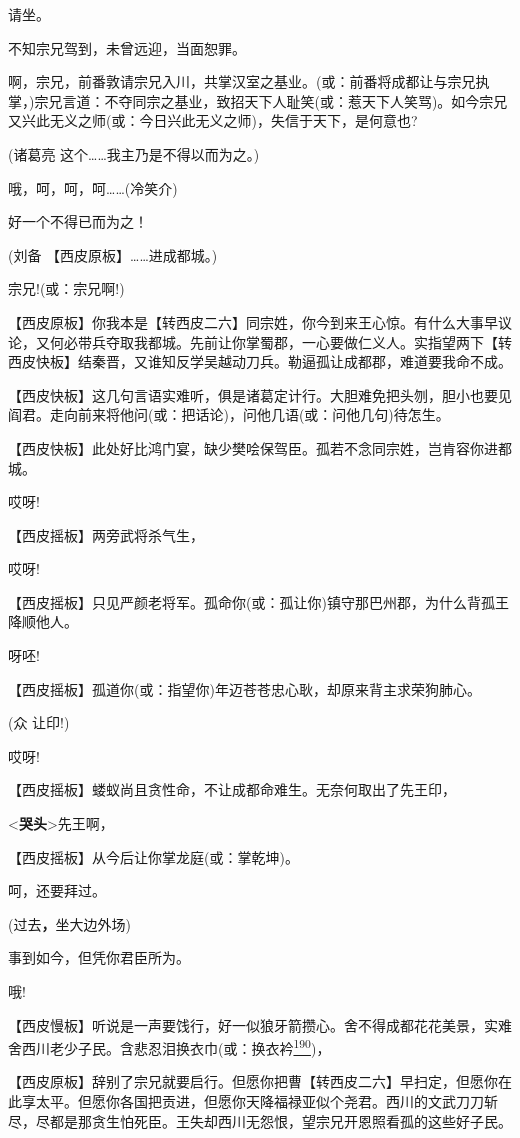 请坐。

不知宗兄驾到，未曾远迎，当面恕罪。

啊，宗兄，前番敦请宗兄入川，共掌汉室之基业。(或：前番将成都让与宗兄执掌，)宗兄言道：不夺同宗之基业，致招天下人耻笑(或：惹天下人笑骂)。如今宗兄又兴此无义之师(或：今日兴此无义之师)，失信于天下，是何意也?

(诸葛亮 这个\ldots{}\ldots{}我主乃是不得以而为之。)

哦，呵，呵，呵\ldots{}\ldots{}(冷笑介)

好一个不得已而为之！

(刘备 【西皮原板】\ldots{}\ldots{}进成都城。)

宗兄!(或：宗兄啊!)

【西皮原板】你我本是【转西皮二六】同宗姓，你今到来王心惊。有什么大事早议论，又何必带兵夺取我都城。先前让你掌蜀郡，一心要做仁义人。实指望两下【转西皮快板】结秦晋，又谁知反学吴越动刀兵。勒逼孤让成都郡，难道要我命不成。

【西皮快板】这几句言语实难听，俱是诸葛定计行。大胆难免把头刎，胆小也要见阎君。走向前来将他问(或：把话论)，问他几语(或：问他几句)待怎生。

【西皮快板】此处好比鸿门宴，缺少樊哙保驾臣。孤若不念同宗姓，岂肯容你进都城。

哎呀!

【西皮摇板】两旁武将杀气生，

哎呀!

【西皮摇板】只见严颜老将军。孤命你(或：孤让你)镇守那巴州郡，为什么背孤王降顺他人。

呀呸!

【西皮摇板】孤道你(或：指望你)年迈苍苍忠心耿，却原来背主求荣狗肺心。

(众 让印!)

哎呀!

【西皮摇板】蝼蚁尚且贪性命，不让成都命难生。无奈何取出了先王印，

\textless{}\textbf{哭头}\textgreater{}先王啊，

【西皮摇板】从今后让你掌龙庭(或：掌乾坤)。

呵，还要拜过。

(过去\textbf{，}坐大边外场)

事到如今，但凭你君臣所为。

哦!

【西皮慢板】听说是一声要饯行，好一似狼牙箭攒心。舍不得成都花花美景，实难舍西川老少子民。含悲忍泪换衣巾(或：换衣衿\protect\hyperlink{fn190}{\textsuperscript{190}})，

【西皮原板】辞别了宗兄就要启行。但愿你把曹【转西皮二六】早扫定，但愿你在此享太平。但愿你各国把贡进，但愿你天降福禄亚似个尧君。西川的文武刀刀斩尽，尽都是那贪生怕死臣。王失却西川无怨恨，望宗兄开恩照看孤的这些好子民。

